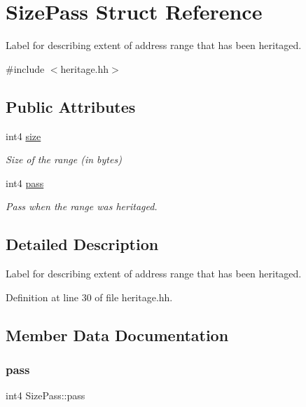\hypertarget{struct_size_pass}{}\section{Size\+Pass Struct Reference}
\label{struct_size_pass}


Label for describing extent of address range that has been heritaged.  




{\ttfamily \#include $<$heritage.\+hh$>$}

\subsection*{Public Attributes}
\begin{DoxyCompactItemize}
\item 
int4 \mbox{\hyperlink{struct_size_pass_acd245e745e9e1b1bd747530b72a710fc}{size}}
\begin{DoxyCompactList}\small\item\em Size of the range (in bytes) \end{DoxyCompactList}\item 
int4 \mbox{\hyperlink{struct_size_pass_ae0878da86fd9704b91da291f9bef3e84}{pass}}
\begin{DoxyCompactList}\small\item\em Pass when the range was heritaged. \end{DoxyCompactList}\end{DoxyCompactItemize}


\subsection{Detailed Description}
Label for describing extent of address range that has been heritaged. 

Definition at line 30 of file heritage.\+hh.



\subsection{Member Data Documentation}
\mbox{\label{struct_size_pass_ae0878da86fd9704b91da291f9bef3e84}} 
\subsubsection{\texorpdfstring{pass}{pass}}
{\footnotesize\ttfamily int4 Size\+Pass\+::pass}



